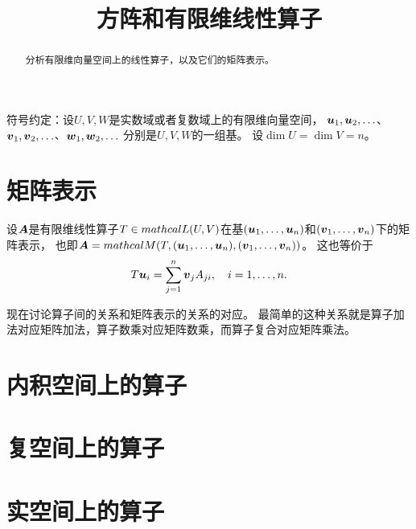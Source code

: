 \documentclass[UTF8]{ctexart}
\title{方阵和有限维线性算子}
\begin{document}
\maketitle

\begin{abstract}
    分析有限维向量空间上的线性算子，以及它们的矩阵表示。
\end{abstract}

符号约定：设$U, V, W$是实数域或者复数域上的有限维向量空间，
$\vb*{u}_1, \vb*{u}_2, \ldots$、$\vb*{v}_1, \vb*{v}_2, \ldots$、$\vb*{w}_1, \vb*{w}_2, \ldots$
分别是$U, V, W$的一组基。
设$\dim U = \dim V = n$。
\newcommand*{\ubasis}{(\vb*{u}_1, \ldots, \vb*{u}_n)}
\newcommand*{\vbasis}{(\vb*{v}_1, \ldots, \vb*{v}_n)}

\section{矩阵表示}
设$\vb*{A}$是有限维线性算子$T \in \\mathcal{L}(U, V)$在基$\ubasis$和$\vbasis$下的矩阵表示，
也即$\vb*{A} = \\mathcal{M}(T, \ubasis, \vbasis)$。
这也等价于
\[
    T \vb*{u}_i = \sum_{j=1}^n \vb*{v}_j A_{ji}, \quad i = 1, \ldots, n.
\]

现在讨论算子间的关系和矩阵表示的关系的对应。
最简单的这种关系就是算子加法对应矩阵加法，算子数乘对应矩阵数乘，而算子复合对应矩阵乘法。


\section{内积空间上的算子}

\section{复空间上的算子}

\section{实空间上的算子}
\end{document}

